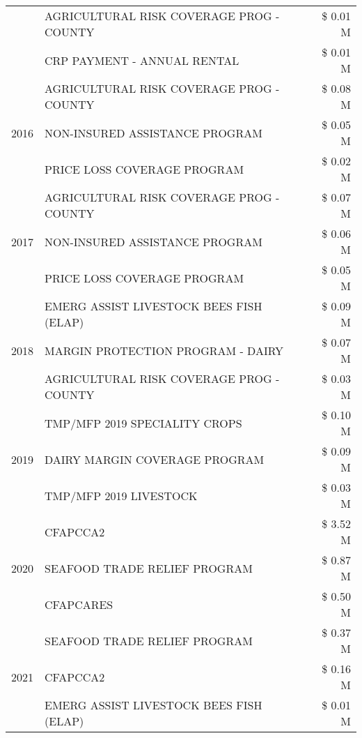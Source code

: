 \begin{tabular}{llr}
 & AGRICULTURAL RISK COVERAGE PROG - COUNTY & \$ 0.01 M \\
 & CRP PAYMENT - ANNUAL RENTAL & \$ 0.01 M \\
\cline{1-3}
\multirow[t]{3}{*}{2016} & AGRICULTURAL RISK COVERAGE PROG - COUNTY & \$ 0.08 M \\
 & NON-INSURED ASSISTANCE PROGRAM & \$ 0.05 M \\
 & PRICE LOSS COVERAGE PROGRAM & \$ 0.02 M \\
\cline{1-3}
\multirow[t]{3}{*}{2017} & AGRICULTURAL RISK COVERAGE PROG - COUNTY & \$ 0.07 M \\
 & NON-INSURED ASSISTANCE PROGRAM & \$ 0.06 M \\
 & PRICE LOSS COVERAGE PROGRAM & \$ 0.05 M \\
\cline{1-3}
\multirow[t]{3}{*}{2018} & EMERG ASSIST LIVESTOCK BEES FISH (ELAP) & \$ 0.09 M \\
 & MARGIN PROTECTION PROGRAM - DAIRY & \$ 0.07 M \\
 & AGRICULTURAL RISK COVERAGE PROG - COUNTY & \$ 0.03 M \\
\cline{1-3}
\multirow[t]{3}{*}{2019} & TMP/MFP 2019 SPECIALITY CROPS & \$ 0.10 M \\
 & DAIRY MARGIN COVERAGE PROGRAM & \$ 0.09 M \\
 & TMP/MFP 2019 LIVESTOCK & \$ 0.03 M \\
\cline{1-3}
\multirow[t]{3}{*}{2020} & CFAPCCA2 & \$ 3.52 M \\
 & SEAFOOD TRADE RELIEF PROGRAM & \$ 0.87 M \\
 & CFAPCARES & \$ 0.50 M \\
\cline{1-3}
\multirow[t]{3}{*}{2021} & SEAFOOD TRADE RELIEF PROGRAM & \$ 0.37 M \\
 & CFAPCCA2 & \$ 0.16 M \\
 & EMERG ASSIST LIVESTOCK BEES FISH (ELAP) & \$ 0.01 M \\
\cline{1-3}
\bottomrule
\end{tabular}
